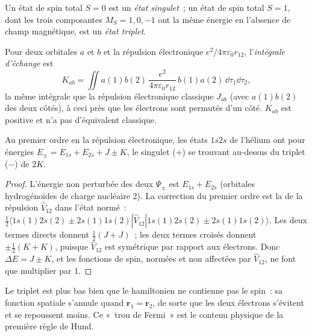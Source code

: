 \begin{definition}\label{def:b3:many-electron-atoms:singlet-triplet}
Un état de spin total $S = 0$ est un \emph{état singulet}~;
un état de spin total $S = 1$, dont les trois composantes $M_S = 1, 0, -1$
ont la même énergie en l'absence de champ magnétique, est un \emph{état
triplet}.
\end{definition}

\begin{definition}\label{def:b3:many-electron-atoms:exchange}
Pour deux orbitales $a$ et $b$ et la répulsion électronique $e^2/4\pi\varepsilon_0
r_{12}$, l'\emph{intégrale d'échange} est
\[
K_{ab} = \iint a(1)b(2)\,\frac{e^2}{4\pi\varepsilon_0r_{12}}\,b(1)a(2)\,\dd\tau_1\dd\tau_2,
\]
la même intégrale que la répulsion électronique classique $J_{ab}$ (avec
$a(1)b(2)$ des deux côtés), à ceci près que les électrons sont permutés
d'un côté. $K_{ab}$ est positive et n'a pas d'équivalent classique.
\end{definition}

\begin{proposition}\label{prop:b3:many-electron-atoms:helium}
Au premier ordre en la répulsion électronique, les états $1s2s$ de
l'hélium ont pour énergies $E_\pm = E_{1s} + E_{2s} + J \pm K$, le
singulet ($+$) se trouvant au-dessus du triplet ($-$) de $2K$.
\end{proposition}

\begin{proof}
L'énergie non perturbée des deux $\Psi_\pm$ est $E_{1s} + E_{2s}$ (orbitales
hydrogénoïdes de charge nucléaire 2). La correction du premier ordre est
la  de la répulsion $\hat V_{12}$ dans l'état normé~:
$\frac12\langle 1s(1)2s(2) \pm 2s(1)1s(2)|\hat V_{12}|1s(1)2s(2) \pm
2s(1)1s(2)\rangle$. Les deux termes directs donnent $\frac12(J + J)$~; les
deux termes croisés donnent $\pm\frac12(K + K)$, puisque $\hat V_{12}$ est
symétrique par rapport aux électrons. Donc $\Delta E = J \pm K$, et les
fonctions de spin, normées et non affectées par $\hat V_{12}$, ne font
que multiplier par 1.
\end{proof}

Le triplet est plus bas bien que le hamiltonien ne contienne pas le
spin~: sa fonction spatiale s'annule quand $\mathbf r_1 = \mathbf r_2$,
de sorte que les deux électrons s'évitent et se repoussent moins. Ce
«~trou de Fermi~» est le contenu physique de la première règle de Hund.

